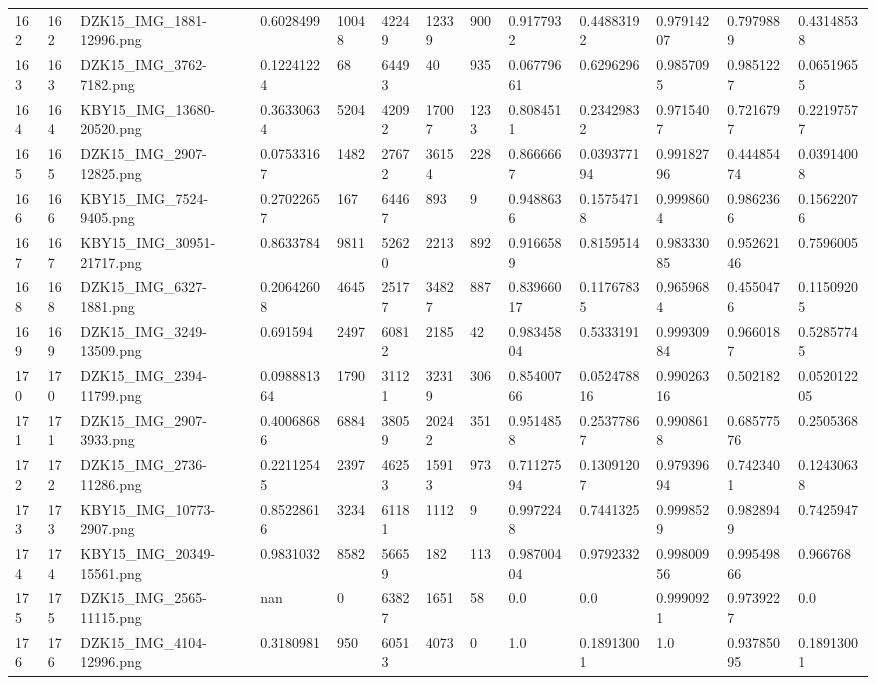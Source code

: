 \documentclass[11pt, a4paper, twoside]{report}
\begin{document}
\begin{longtable}[c]{@{}lllllllllllll@{}}
162 & 162 & DZK15\_IMG\_1881-12996.png & 0.6028499 & 10048 & 42249 & 12339 & 900 & 0.9177932 & 0.44883192 & 0.97914207 & 0.7979889 & 0.43148538 \\
163 & 163 & DZK15\_IMG\_3762-7182.png & 0.12241224 & 68 & 64493 & 40 & 935 & 0.06779661 & 0.6296296 & 0.9857095 & 0.9851227 & 0.06519655 \\
164 & 164 & KBY15\_IMG\_13680-20520.png & 0.36330634 & 5204 & 42092 & 17007 & 1233 & 0.8084511 & 0.23429832 & 0.9715407 & 0.7216797 & 0.22197577 \\
165 & 165 & DZK15\_IMG\_2907-12825.png & 0.07533167 & 1482 & 27672 & 36154 & 228 & 0.8666667 & 0.039377194 & 0.99182796 & 0.44485474 & 0.03914008 \\
166 & 166 & KBY15\_IMG\_7524-9405.png & 0.27022657 & 167 & 64467 & 893 & 9 & 0.9488636 & 0.15754718 & 0.9998604 & 0.9862366 & 0.15622076 \\
167 & 167 & KBY15\_IMG\_30951-21717.png & 0.8633784 & 9811 & 52620 & 2213 & 892 & 0.9166589 & 0.8159514 & 0.98333085 & 0.95262146 & 0.7596005 \\
168 & 168 & DZK15\_IMG\_6327-1881.png & 0.20642608 & 4645 & 25177 & 34827 & 887 & 0.83966017 & 0.11767835 & 0.9659684 & 0.4550476 & 0.11509205 \\
169 & 169 & DZK15\_IMG\_3249-13509.png & 0.691594 & 2497 & 60812 & 2185 & 42 & 0.98345804 & 0.5333191 & 0.99930984 & 0.9660187 & 0.52857745 \\
170 & 170 & DZK15\_IMG\_2394-11799.png & 0.098881364 & 1790 & 31121 & 32319 & 306 & 0.85400766 & 0.052478816 & 0.99026316 & 0.502182 & 0.052012205 \\
171 & 171 & DZK15\_IMG\_2907-3933.png & 0.40068686 & 6884 & 38059 & 20242 & 351 & 0.9514858 & 0.25377867 & 0.9908618 & 0.68577576 & 0.2505368 \\
172 & 172 & DZK15\_IMG\_2736-11286.png & 0.22112545 & 2397 & 46253 & 15913 & 973 & 0.71127594 & 0.13091207 & 0.97939694 & 0.7423401 & 0.12430638 \\
173 & 173 & KBY15\_IMG\_10773-2907.png & 0.85228616 & 3234 & 61181 & 1112 & 9 & 0.9972248 & 0.7441325 & 0.9998529 & 0.9828949 & 0.7425947 \\
174 & 174 & KBY15\_IMG\_20349-15561.png & 0.9831032 & 8582 & 56659 & 182 & 113 & 0.98700404 & 0.9792332 & 0.99800956 & 0.99549866 & 0.966768 \\
175 & 175 & DZK15\_IMG\_2565-11115.png & nan & 0 & 63827 & 1651 & 58 & 0.0 & 0.0 & 0.9990921 & 0.9739227 & 0.0 \\
176 & 176 & DZK15\_IMG\_4104-12996.png & 0.3180981 & 950 & 60513 & 4073 & 0 & 1.0 & 0.18913001 & 1.0 & 0.93785095 & 0.18913001 \\

\end{longtable}
\end{document}
